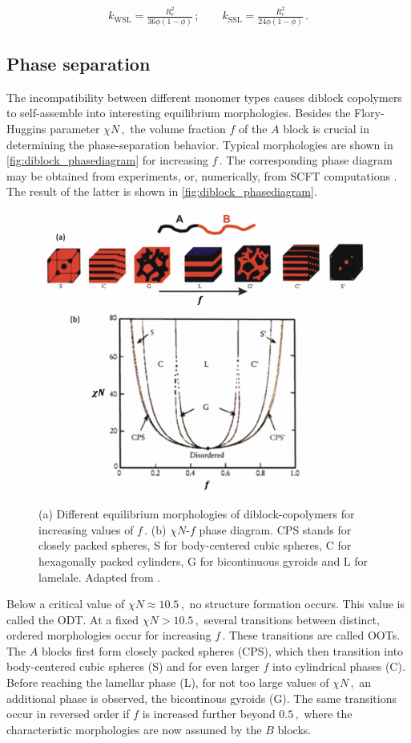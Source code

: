 \documentclass[bachelor,       %
               oneside,        %
               BCOR10mm,       %
               ngerman, english %
               ]{GAUBM}
\begin{document}
\begin{align}
  k_\mathrm{WSL}=\frac{R_e^2}{36\phi(1-\phi)}\,;\qquad k_\mathrm{SSL}=\frac{R_e^2}{24\phi(1-\phi)}\,.
\end{align}

\subsection{Phase separation}

The incompatibility between different monomer types causes diblock copolymers to self-assemble into interesting equilibrium morphologies. Besides the Flory-Huggins parameter $\chi N\,,$ the volume fraction $f$ of the $A$ block is crucial in determining the phase-separation behavior. Typical morphologies are shown in \autoref{fig:diblock_phasediagram} for increasing $f\,.$ The corresponding phase diagram may be obtained from experiments, or, numerically, from \ac{SCFT} computations \cite{matsen_copolymer}. The result of the latter is shown in \autoref{fig:diblock_phasediagram}.


\begin{figure}[h]
  \centering
  \includegraphics[width=0.8\linewidth]{figures/diblock_phasediagram.png}
  \caption{(a) Different equilibrium morphologies of diblock-copolymers for increasing values of $f\,.$ (b) $\chi N$-$f$ phase diagram. CPS stands for closely packed spheres, S for body-centered cubic spheres, C for hexagonally packed cylinders, G for bicontinuous gyroids and L for lamelale. Adapted from \cite{Mai_diblock_selfassembly}. }
  \label{fig:diblock_phasediagram}
\end{figure}

Below a critical value of $\chi N\approx 10.5\,,$ no structure formation occurs. This value is called the \ac{ODT}. At a fixed $\chi N> 10.5\,,$ several transitions between distinct, ordered morphologies occur for increasing $f\,.$ These transitions are called \acp{OOT}. The $A$ blocks first form closely packed spheres (CPS), which then transition into body-centered cubic spheres (S) and for even larger $f$ into cylindrical phases (C). Before reaching the lamellar phase (L), for not too large values of $\chi N\,,$ an additional phase is observed, the bicontinous gyroids (G). The same transitions occur in reversed order if $f$ is increased further beyond $0.5\,,$ where the characteristic morphologies are now assumed by the $B$ blocks.
\end{document}
